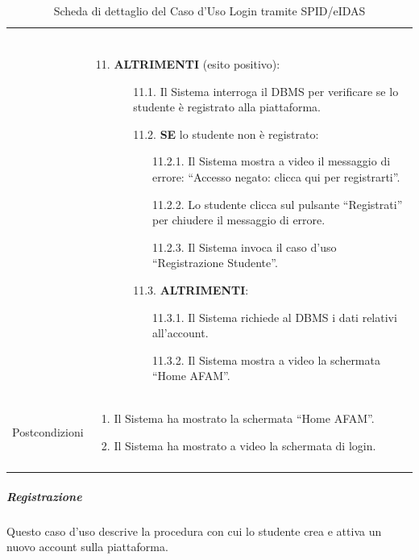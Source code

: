 \documentclass[12pt,a4paper]{article}
\begin{document}
\begin{longtable}{|
>{\columncolor{unipablue}\color{white}\bfseries\raggedright\arraybackslash}p{3.4cm}|
>{\raggedright\arraybackslash}p{11.1cm}|}
\begin{enumerate}
\end{enumerate} \\
&
\begin{enumerate}
    \setcounter{enumi}{10}
    \item \textbf{ALTRIMENTI} (esito positivo):
    \begin{itemize}
        \item[11.1.] Il Sistema interroga il DBMS per verificare se lo studente è registrato alla piattaforma.
        \item[11.2.] \textbf{SE} lo studente non è registrato:
        \begin{itemize}
            \item[11.2.1.] Il Sistema mostra a video il messaggio di errore: ``Accesso negato: clicca qui per registrarti''.
            \item[11.2.2.] Lo studente clicca sul pulsante ``Registrati'' per chiudere il messaggio di errore.
            \item[11.2.3.] Il Sistema invoca il caso d'uso ``Registrazione Studente''.
        \end{itemize}
        \item[11.3.] \textbf{ALTRIMENTI}:
        \begin{itemize}
            \item[11.3.1.] Il Sistema richiede al DBMS i dati relativi all'account.
            \item[11.3.2.] Il Sistema mostra a video la schermata ``Home AFAM''.
        \end{itemize}
    \end{itemize}
\end{enumerate} \\ \hline
Postcondizioni &
\begin{enumerate}
    \item Il Sistema ha mostrato la schermata ``Home AFAM''.
    \item Il Sistema ha mostrato a video la schermata di login.
\end{enumerate} \\ \hline
\caption{Scheda di dettaglio del Caso d'Uso Login tramite SPID/eIDAS}
\label{tab:uc_login_spid_eidas}\\
\end{longtable}
\normalsize

\newpage
\subparagraph{Registrazione}

Questo caso d'uso descrive la procedura con cui lo studente crea e attiva un nuovo account sulla piattaforma.
\end{document}
